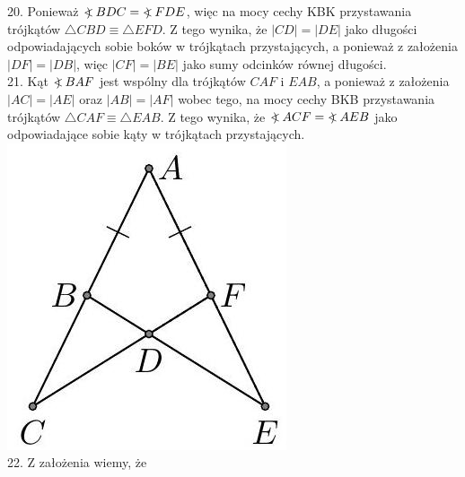 \documentclass[10pt]{article}
\newcommand\Varangle{\mathop{{<\!\!\!\!\!\text{\small)}}\:}\nolimits}
\begin{document}
20. Ponieważ \(\Varangle B D C=\Varangle F D E\), więc na mocy cechy KBK przystawania trójkątów \(\triangle C B D \equiv \triangle E F D\). Z tego wynika, że \(|C D|=|D E|\) jako długości odpowiadających sobie boków w trójkątach przystających, a ponieważ z założenia \(|D F|=|D B|\), więc \(|C F|=|B E|\) jako sumy odcinków równej długości.\\
21. Kąt \(\Varangle B A F\) jest wspólny dla trójkątów \(C A F\) i \(E A B\), a ponieważ z założenia \(|A C|=|A E|\) oraz \(|A B|=|A F|\) wobec tego, na mocy cechy BKB przystawania trójkątów \(\triangle C A F \equiv \triangle E A B\). Z tego wynika, że \(\Varangle A C F=\Varangle A E B\) jako odpowiadające sobie kąty w trójkątach przystających.\\
\includegraphics[max width=\textwidth, center]{2024_11_21_71f62bd117d375398909g-065}\\
22. Z założenia wiemy, że\\
\end{document}
